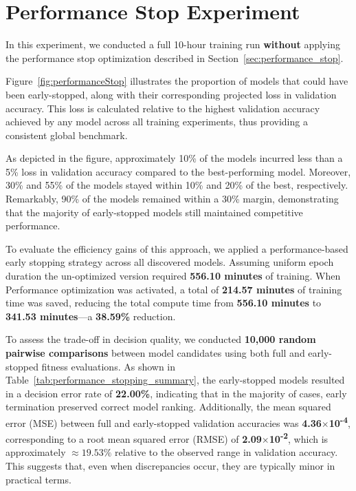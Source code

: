 \section{Performance Stop Experiment}

In this experiment, we conducted a full 10-hour training run \textbf{without} applying the performance stop optimization described in Section~\ref{sec:performance_stop}.

Figure~\ref{fig:performanceStop} illustrates the proportion of models that could have been early-stopped, along with their corresponding projected loss in validation accuracy. This loss is calculated relative to the highest validation accuracy achieved by any model across all training experiments, thus providing a consistent global benchmark.

As depicted in the figure, approximately 10\% of the models incurred less than a 5\% loss in validation accuracy compared to the best-performing model. Moreover, 30\% and 55\% of the models stayed within 10\% and 20\% of the best, respectively. Remarkably, 90\% of the models remained within a 30\% margin, demonstrating that the majority of early-stopped models still maintained competitive performance.

To evaluate the efficiency gains of this approach, we applied a performance-based early stopping strategy across all discovered models. Assuming uniform epoch duration the un-optimized version required \textbf{556.10 minutes} of training. When Performance optimization was activated, a total of \textbf{214.57 minutes} of training time was saved, reducing the total compute time from \textbf{556.10 minutes} to \textbf{341.53 minutes}—a \textbf{38.59\%} reduction.

To assess the trade-off in decision quality, we conducted \textbf{10,000 random pairwise comparisons} between model candidates using both full and early-stopped fitness evaluations. As shown in Table~\ref{tab:performance_stopping_summary}, the early-stopped models resulted in a decision error rate of \textbf{22.00\%}, indicating that in the majority of cases, early termination preserved correct model ranking. Additionally, the mean squared error (MSE) between full and early-stopped validation accuracies was \textbf{4.36$\times$10\textsuperscript{-4}}, corresponding to a root mean squared error (RMSE) of \textbf{2.09$\times$10\textsuperscript{-2}}, which is approximately \textbf{$\approx 19.53\%$} relative to the observed range in validation accuracy. This suggests that, even when discrepancies occur, they are typically minor in practical terms.

